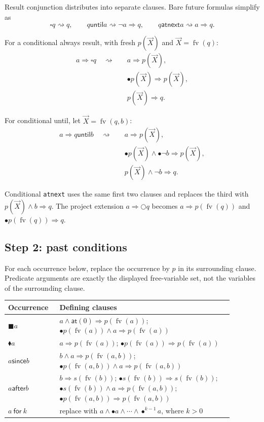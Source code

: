 \documentclass[11pt]{article}
\newcommand{\prev}{\mathbin{\bullet}}
\newcommand{\alwayspast}{\mathbin{\blacksquare}}
\newcommand{\once}{\mathbin{\blacklozenge}}
\newcommand{\alwaysfuture}{\mathbin{\square}}
\newcommand{\FV}{\operatorname{fv}}
\newcommand{\at}{\mathsf{at}}
\newcommand{\since}{\mathbin{\mathsf{since}}}
\newcommand{\after}{\mathbin{\mathsf{after}}}
\newcommand{\until}{\mathbin{\mathsf{until}}}
\newcommand{\atnext}{\mathbin{\mathsf{atnext}}}
\begin{document}
Result conjunction distributes into separate clauses.  Bare future formulas
simplify as
\[
\alwaysfuture q\rightsquigarrow q,
\qquad
q\until a\rightsquigarrow \neg a\Rightarrow q,
\qquad
q\atnext a\rightsquigarrow a\Rightarrow q.
\]

For a conditional always result, with fresh $p(\vec X)$ and
$\vec X=\FV(q)$:
\begin{align*}
a\Rightarrow\alwaysfuture q\quad\rightsquigarrow\quad
&a\Rightarrow p(\vec X),\\
&\prev p(\vec X)\Rightarrow p(\vec X),\\
&p(\vec X)\Rightarrow q.
\end{align*}

For conditional until, let $\vec X=\FV(q,b)$:
\begin{align*}
a\Rightarrow q\until b\quad\rightsquigarrow\quad
&a\Rightarrow p(\vec X),\\
&\prev p(\vec X)\wedge\prev\neg b\Rightarrow p(\vec X),\\
&p(\vec X)\wedge\neg b\Rightarrow q.
\end{align*}

Conditional \verb|atnext| uses the same first two clauses and replaces the
third with $p(\vec X)\wedge b\Rightarrow q$.  The project extension
$a\Rightarrow\bigcirc q$ becomes
$a\Rightarrow p(\FV(q))$ and $\prev p(\FV(q))\Rightarrow q$.

\subsection{Step 2: past conditions}

For each occurrence below, replace the occurrence by $p$ in its surrounding
clause.  Predicate arguments are exactly the displayed free-variable set,
not the variables of the surrounding clause.

\begin{center}
\begin{longtable}{>{\raggedright\arraybackslash}p{0.18\linewidth}
                  >{\raggedright\arraybackslash}p{0.70\linewidth}}
\toprule
Occurrence & Defining clauses \\
\midrule
$\alwayspast a$ &
$a\wedge\at(0)\Rightarrow p(\FV(a))$;
$\prev p(\FV(a))\wedge a\Rightarrow p(\FV(a))$ \\
$\once a$ &
$a\Rightarrow p(\FV(a))$;
$\prev p(\FV(a))\Rightarrow p(\FV(a))$ \\
$a\since b$ &
$b\wedge a\Rightarrow p(\FV(a,b))$;
$\prev p(\FV(a,b))\wedge a\Rightarrow p(\FV(a,b))$ \\
$a\after b$ &
$b\Rightarrow s(\FV(b))$;
$\prev s(\FV(b))\Rightarrow s(\FV(b))$;
$\prev s(\FV(b))\wedge a\Rightarrow p(\FV(a,b))$;
$\prev p(\FV(a,b))\Rightarrow p(\FV(a,b))$ \\
$a\ \mathsf{for}\ k$ &
replace with $a\wedge\prev a\wedge\cdots\wedge\prev^{k-1}a$, where $k>0$ \\
\bottomrule
\end{longtable}
\end{center}
\end{document}
